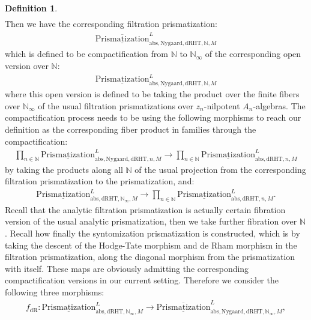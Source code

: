 \documentclass[12pt]{article}
\theoremstyle{definition}
\newtheorem{definition}{Definition}
\begin{document}
\begin{definition}
\begin{align}
\end{align}
Then we have the corresponding filtration prismatization:
\begin{align}
\overline{\underline{\mathrm{Prismatization}}}^L_{\mathrm{abs},\mathrm{Nygaard},\mathrm{dRHT},\mathbb{N},M}
\end{align}
which is defined to be compactification from $\mathbb{N}$ to $\mathbb{N}_\infty$ of the corresponding open version over $\mathbb{N}$:
\begin{align}
{\underline{\mathrm{Prismatization}}}^L_{\mathrm{abs},\mathrm{Nygaard},\mathrm{dRHT},\mathbb{N},M}
\end{align}
where this open version is defined to be taking the product over the finite fibers over $\mathbb{N}_\infty$ of the usual filtration prismatizations over $z_n$-nilpotent $A_n$-algebras. The compactification process needs to be using the following morphisms to reach our definition as the corresponding fiber product in families through the compactification:
\begin{align}
\prod_{n\in \mathbb{N}} {\underline{\mathrm{Prismatization}}}^L_{\mathrm{abs},\mathrm{Nygaard},\mathrm{dRHT},n,M}\rightarrow  \prod_{n\in \mathbb{N}} {\underline{\mathrm{Prismatization}}}^L_{\mathrm{abs},\mathrm{dRHT},n,M}
\end{align}
by taking the products along all $\mathbb{N}$ of the usual projection from the corresponding filtration prismatization to the prismatization, and:
\begin{align}
{\underline{\mathrm{Prismatization}}}^L_{\mathrm{abs},\mathrm{dRHT},\mathbb{N}_\infty,M}\rightarrow  \prod_{n\in \mathbb{N}} {\underline{\mathrm{Prismatization}}}^L_{\mathrm{abs},\mathrm{dRHT},n,M}.
\end{align}
Recall that the analytic filtration prismatization is actually certain fibration version of the usual analytic prismatization, then we take further fibration over $\mathbb{N}$. Recall how finally the syntomization prismatization is constructed, which is by taking the descent of the Hodge-Tate morphism and de Rham morphism in the filtration prismatization, along the diagonal morphism from the prismatization with itself. These maps are obviously admitting the corresponding compactification versions in our current setting. Therefore we consider the following three morphisms:
\begin{align}
f_\mathrm{dR}: {\underline{\mathrm{Prismatization}}}^L_{\mathrm{abs},\mathrm{dRHT},\mathbb{N}_\infty,M}\rightarrow \overline{\underline{\mathrm{Prismatization}}}^L_{\mathrm{abs},\mathrm{Nygaard},\mathrm{dRHT},\mathbb{N}_\infty,M},

\end{align}
\end{definition}
\end{document}

